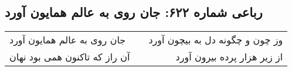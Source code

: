 \begin{center}
\section*{رباعی شماره ۶۲۲: جان روی به عالم همایون آورد}
\label{sec:0622}
\begin{longtable}{l p{0.5cm} r}
جان روی به عالم همایون آورد
&&
وز چون و چگونه دل به بیچون آورد
\\
آن راز که تاکنون همی بود نهان
&&
از زیر هزار پرده بیرون آورد
\\
\end{longtable}
\end{center}
